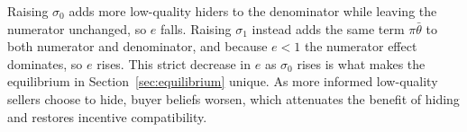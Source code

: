 Raising $\sigma_0$ adds more low-quality hiders to the denominator while leaving the numerator unchanged, so $e$ falls. Raising $\sigma_1$ instead adds the same term $\pi\bar{\theta}$ to both numerator and denominator, and because $e < 1$ the numerator effect dominates, so $e$ rises. This strict decrease in $e$ as $\sigma_0$ rises is what makes the equilibrium in Section~\ref{sec:equilibrium} unique. As more informed low-quality sellers choose to hide, buyer beliefs worsen, which attenuates the benefit of hiding and restores incentive compatibility.
